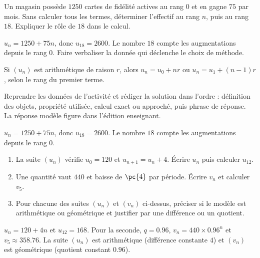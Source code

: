 \begin{activity}
Un magasin possède $\num{1250}$ cartes de fidélité actives au rang $0$ et en gagne $75$ par mois. Sans calculer tous les termes, déterminer l'effectif au rang $n$, puis au rang $18$. Expliquer le rôle de $18$ dans le calcul.

\end{activity}
\begin{solution}$u_n=\num{1250}+75n$, donc $u_{18}=\num{2600}$. Le nombre $18$ compte les augmentations depuis le rang $0$. Faire verbaliser la donnée qui déclenche le choix de méthode.\end{solution}

\begin{summary}Si $(u_n)$ est arithmétique de raison $r$, alors $u_n=u_0+nr$ ou $u_n=u_1+(n-1)r$, selon le rang du premier terme.\end{summary}

\begin{example}
Reprendre les données de l'activité et rédiger la solution dans l'ordre : définition des objets, propriété utilisée, calcul exact ou approché, puis phrase de réponse. La réponse modèle figure dans l'édition enseignant.
\end{example}
\begin{solution}$u_n=\num{1250}+75n$, donc $u_{18}=\num{2600}$. Le nombre $18$ compte les augmentations depuis le rang $0$.\end{solution}

\begin{exercise}[essentiel]
\begin{enumerate}\item La suite $(u_n)$ vérifie $u_0=120$ et $u_{n+1}=u_n+4$. Écrire $u_n$ puis calculer $u_{12}$.\item Une quantité vaut $440$ et baisse de $\pc{4}$ par période. Écrire $v_n$ et calculer $v_5$.\item Pour chacune des suites $(u_n)$ et $(v_n)$ ci-dessus, préciser si le modèle est arithmétique ou géométrique et justifier par une différence ou un quotient.\end{enumerate}
\end{exercise}
\begin{solution}$u_n=120+4n$ et $u_{12}=168$. Pour la seconde, $q=\num{0,96}$, $v_n=440\times\num{0,96}^n$ et $v_5\approx\num{358,76}$. La suite $(u_n)$ est arithmétique (différence constante $4$) et $(v_n)$ est géométrique (quotient constant $\num{0,96}$).\end{solution}

